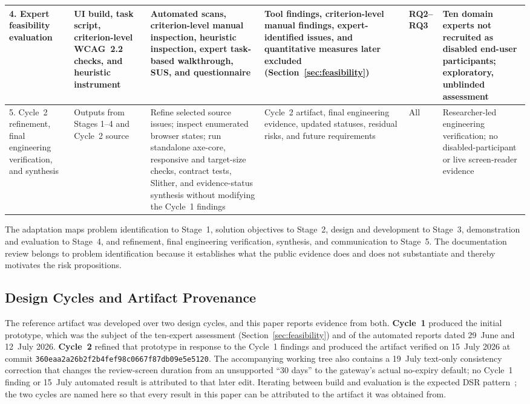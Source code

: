 \documentclass[journal]{IEEEtran}
\begin{document}
\begin{table}[!htbp]
\begin{tabularx}{\textwidth}{|p{2.2cm}|p{2.4cm}|X|p{2.4cm}|p{1.1cm}|p{2.2cm}|}
\hline
4. Expert feasibility evaluation & UI build, task script, criterion-level WCAG~2.2 checks, and heuristic instrument & Automated scans, criterion-level manual inspection, heuristic inspection, expert task-based walkthrough, SUS, and questionnaire & Tool findings, criterion-level manual findings, expert-identified issues, and quantitative measures later excluded (Section~\ref{sec:feasibility}) & RQ2--RQ3 & Ten domain experts not recruited as disabled end-user participants; exploratory, unblinded assessment \\
\hline
5. Cycle~2 refinement, final engineering verification, and synthesis & Outputs from Stages 1--4 and Cycle~2 source & Refine selected source issues; inspect enumerated browser states; run standalone axe-core, responsive and target-size checks, contract tests, Slither, and evidence-status synthesis without modifying the Cycle~1 findings & Cycle~2 artifact, final engineering evidence, updated statuses, residual risks, and future requirements & All & Researcher-led engineering verification; no disabled-participant or live screen-reader evidence \\
\hline
\end{tabularx}
\end{table}

The adaptation maps problem identification to Stage~1, solution objectives to Stage~2, design and development to Stage~3, demonstration and evaluation to Stage~4, and refinement, final engineering verification, synthesis, and communication to Stage~5. The documentation review belongs to problem identification because it establishes what the public evidence does and does not substantiate and thereby motivates the risk propositions.

\subsection{Design Cycles and Artifact Provenance}
\label{subsec:cycles}

The reference artifact was developed over two design cycles, and this paper reports evidence from both. \textbf{Cycle~1} produced the initial prototype, which was the subject of the ten-expert assessment (Section~\ref{sec:feasibility}) and of the automated reports dated 29~June and 12~July 2026. \textbf{Cycle~2} refined that prototype in response to the Cycle~1 findings and produced the artifact verified on 15~July 2026 at commit \texttt{360eaa2a\allowbreak 26b2f2b4\allowbreak fef98c06\allowbreak 67f87db0\allowbreak 9e5e5120}. The accompanying working tree also contains a 19~July text-only consistency correction that changes the review-screen duration from an unsupported ``30 days'' to the gateway's actual no-expiry default; no Cycle~1 finding or 15~July automated result is attributed to that later edit. Iterating between build and evaluation is the expected DSR pattern~\cite{peffers2007dsrm,hevner2004design}; the two cycles are named here so that every result in this paper can be attributed to the artifact it was obtained from.
\end{document}
